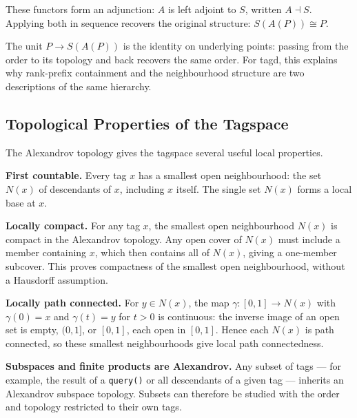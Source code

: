 \documentclass{article}
\begin{document}
\begin{center}
\end{center}

These functors form an adjunction: $A$ is left adjoint to $S$, written
$A \dashv S$. Applying both in sequence recovers the original structure:
$S(A(P)) \cong P$.

The unit $P\to S(A(P))$ is the identity on underlying points: passing from
the order to its topology and back recovers the same order. For tagd,
this explains why rank-prefix containment and the neighbourhood structure
are two descriptions of the same hierarchy.

\subsection{Topological Properties of the Tagspace}

The Alexandrov topology gives the tagspace several useful local properties.

\textbf{First countable.} Every tag $x$ has a smallest open neighbourhood: the
set $N(x)$ of descendants of $x$, including $x$ itself. The single set
$N(x)$ forms a local base at $x$.

\textbf{Locally compact.} For any tag $x$, the smallest open neighbourhood
$N(x)$ is compact in the Alexandrov topology. Any open cover of $N(x)$ must
include a member containing $x$, which then contains all of $N(x)$,
giving a one-member subcover. This proves compactness of the smallest
open neighbourhood, without a Hausdorff assumption.

\textbf{Locally path connected.} For $y\in N(x)$, the map
$\gamma:[0,1]\to N(x)$ with $\gamma(0)=x$ and $\gamma(t)=y$ for $t>0$
is continuous: the inverse image of an open set is empty, $(0,1]$, or
$[0,1]$, each open in $[0,1]$. Hence each $N(x)$ is path connected,
so these smallest neighbourhoods give local path connectedness.

\textbf{Subspaces and finite products are Alexandrov.} Any subset of tags ---
for example, the result of a \texttt{query()} or all descendants of a given tag
--- inherits an Alexandrov subspace topology. Subsets can therefore be
studied with the order and topology restricted to their own tags.
\end{document}
